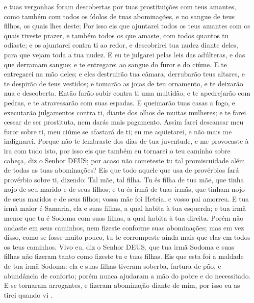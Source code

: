 { e tuas vergonhas foram descobertas por tuas prostituições com teus amantes, como também com todos os ídolos de tuas abominações, e no sangue de teus filhos, os quais lhes deste;
  Por isso eis que ajuntarei todos os teus amantes com os quais tiveste prazer, e também todos os que amaste, com todos quantos tu odiaste; e os ajuntarei contra ti ao redor, e descobrirei tua nudez diante deles, para que vejam toda a tua nudez.
  E eu te julgarei pelas leis das adúlteras, e das que derramam sangue; e te entregarei ao sangue do furor e do ciúme.
  E te entregarei na mão deles; e eles destruirão tua câmara, derrubarão teus altares, e te despirão de teus vestidos; e tomarão as joias de teu ornamento, e te deixarão nua e descoberta.
  Então farão subir contra ti uma multidão, e te apedrejarão com pedras, e te atravessarão com suas espadas.
  E queimarão tuas casas a fogo, e executarão julgamentos contra ti, diante dos olhos de muitas mulheres; e te farei cessar de ser prostituta, nem darás mais pagamento.
  Assim farei descansar meu furor sobre ti, meu ciúme se afastará de ti; eu me aquietarei, e não mais me indignarei.
  Porque não te lembraste dos dias de tua juventude, e me provocaste à ira com tudo isto, por isso eis que também eu tornarei o teu caminho sobre
{} cabeça, diz o Senhor DEUS; por acaso não cometeste tu tal promiscuidade além de todas as tuas abominações?
  Eis que todo aquele que usa de provérbios fará provérbio sobre ti, dizendo: Tal mãe, tal filha.
  Tu és filha de tua mãe, que tinha nojo de seu marido e de seus filhos; e tu és irmã de tuas irmãs, que tinham nojo de seus maridos e de seus filhos; vossa mãe foi Heteia, e vosso pai amorreu.
  E tua irmã maior é Samaria, ela e suas filhas, a qual habita à tua esquerda; e tua irmã menor que tu é Sodoma com suas filhas, a qual habita à tua direita.
  Porém não andaste em seus caminhos, nem fizeste conforme suas abominações; mas em vez disso, como se fosse muito pouco, tu te corrompeste ainda mais que elas em todos os teus caminhos.
  Vivo eu, diz o Senhor DEUS, que tua irmã Sodoma e suas filhas não fizeram tanto como fizeste tu e tuas filhas.
  Eis que esta foi a maldade de tua irmã Sodoma: ela e suas filhas tiveram soberba, fartura de pão, e abundância de conforto; porém nunca ajudaram a mão do pobre e do necessitado.
  E se tornaram arrogantes, e fizeram abominação diante de mim, por isso eu as tirei quando vi
{} .
}
